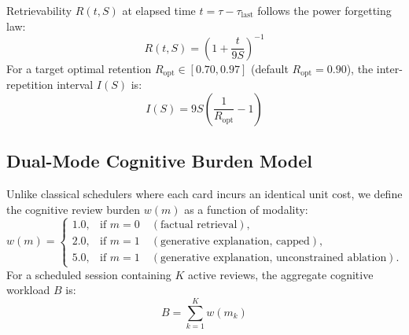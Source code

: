\documentclass[11pt,a4paper]{article}
\begin{document}
Retrievability $R(t, S)$ at elapsed time $t = \tau - \tau_{\text{last}}$ follows the power forgetting law:
\begin{equation}
    \label{eq:retrievability}
    R(t, S) = \left( 1 + \frac{t}{9S} \right)^{-1}
\end{equation}
For a target optimal retention $R_{\text{opt}} \in [0.70, 0.97]$ (default $R_{\text{opt}} = 0.90$), the inter-repetition interval $I(S)$ is:
\begin{equation}
    \label{eq:interval}
    I(S) = 9S \left( \frac{1}{R_{\text{opt}}} - 1 \right)
\end{equation}

\subsection{Dual-Mode Cognitive Burden Model}
Unlike classical schedulers where each card incurs an identical unit cost, we define the cognitive review burden $w(m)$ as a function of modality:
\begin{equation}
    w(m) = \begin{cases}
        1.0, & \text{if } m = 0 \quad (\text{factual retrieval}), \\
        2.0, & \text{if } m = 1 \quad (\text{generative explanation, capped}), \\
        5.0, & \text{if } m = 1 \quad (\text{generative explanation, unconstrained ablation}).
    \end{cases}
\end{equation}
For a scheduled session containing $K$ active reviews, the aggregate cognitive workload $B$ is:
\begin{equation}
    B = \sum_{k=1}^K w(m_k)
\end{equation}
\end{document}
